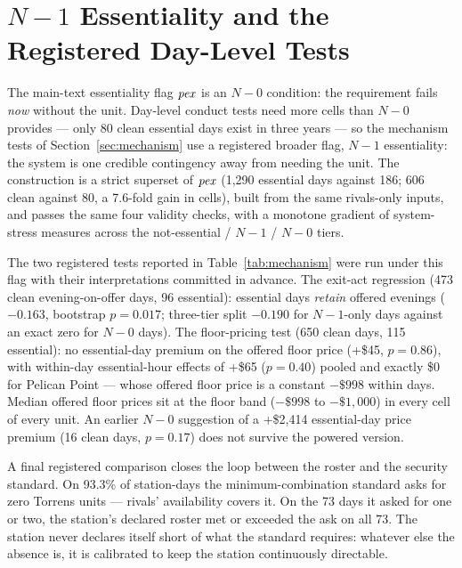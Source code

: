 \section{$N-1$ Essentiality and the Registered Day-Level Tests}\label{app:n1}

The main-text essentiality flag $\mathit{pex}$ is an $N-0$ condition: the requirement
fails \emph{now} without the unit. Day-level conduct tests need more cells
than $N-0$ provides --- only 80 clean essential days exist in three years ---
so the mechanism tests of Section~\ref{sec:mechanism} use a registered
broader flag, $N-1$ essentiality: the system is one credible contingency away
from needing the unit. The construction is a strict superset of $\mathit{pex}$
(1,290 essential days against 186; 606 clean against 80, a 7.6-fold gain in
cells), built from the same rivals-only inputs, and passes the same four
validity checks, with a monotone gradient of system-stress measures across
the not-essential / $N-1$ / $N-0$ tiers.

The two registered tests reported in Table~\ref{tab:mechanism} were run under
this flag with their interpretations committed in advance. The exit-act
regression (473 clean evening-on-offer days, 96 essential): essential days
\emph{retain} offered evenings ($-0.163$, bootstrap $p=0.017$; three-tier
split $-0.190$ for $N-1$-only days against an exact zero for $N-0$ days). The
floor-pricing test (650 clean days, 115 essential): no essential-day premium
on the offered floor price (+\$45, $p=0.86$), with within-day essential-hour
effects of +\$65 ($p=0.40$) pooled and exactly \$0 for Pelican Point ---
whose offered floor price is a constant $-\$998$ within days. Median offered
floor prices sit at the floor band ($-\$998$ to $-\$1{,}000$) in every cell
of every unit. An earlier $N-0$ suggestion of a +\$2,414 essential-day price
premium (16 clean days, $p=0.17$) does not survive the powered version.

A final registered comparison closes the loop between the roster and the
security standard. On 93.3\% of station-days the minimum-combination standard
asks for zero Torrens units --- rivals' availability covers it. On the 73
days it asked for one or two, the station's declared roster met or exceeded
the ask on all 73. The station never declares itself short of what the
standard requires: whatever else the absence is, it is calibrated to keep the
station continuously directable.
